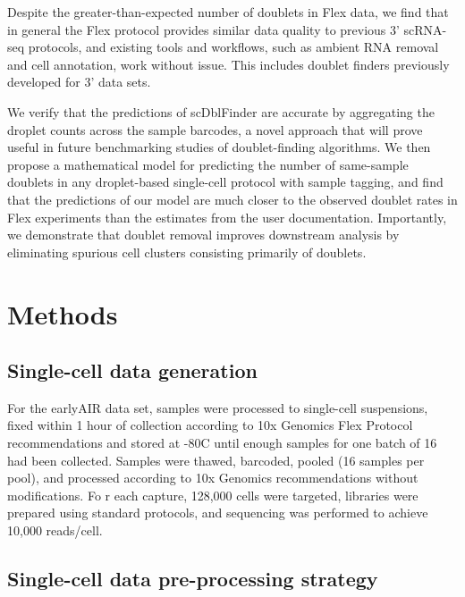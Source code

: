 \documentclass[unnumsec,webpdf,modern,large]{oup-authoring-template}
\begin{document}
	Despite the greater-than-expected number of doublets in Flex data, we find that in general the Flex protocol provides similar data quality to previous 3’ scRNA-seq protocols, and existing tools and workflows, such as ambient RNA removal and cell annotation, work without issue. 
	This includes doublet finders previously developed for 3' data sets.
		
	We verify that the predictions of scDblFinder are accurate by aggregating the droplet counts across the sample barcodes, a novel approach that will prove useful in future benchmarking studies of doublet-finding algorithms. 
	We then propose a mathematical model for predicting the number of same-sample doublets in any droplet-based single-cell protocol with sample tagging, and find that the predictions of our model are much closer to the observed doublet rates in Flex experiments than the estimates from the user documentation. 
	Importantly, we demonstrate that doublet removal improves downstream analysis by eliminating spurious cell clusters consisting primarily of doublets.
	
	
	\section{Methods}
	\label{sec:methods}
	
	\subsection{Single-cell data generation}
	\label{subsec:data_generation}
	
	For the earlyAIR data set, samples were processed to single-cell suspensions, fixed within 1 hour of collection according to 10x Genomics Flex Protocol recommendations 
	\citep{10X_flex_protocol}
	and stored at -80C until enough samples for one batch of 16 had been collected. 
	Samples were thawed, barcoded, pooled (16 samples per pool), and processed according to 10x Genomics recommendations without modifications. Fo
	r each capture, 128,000 cells were targeted, libraries were prepared using standard protocols, and sequencing was performed to achieve 10,000 reads/cell.	
	
	\subsection{Single-cell data pre-processing strategy}
	\label{subsec:preprocessing}
	
\end{document}
